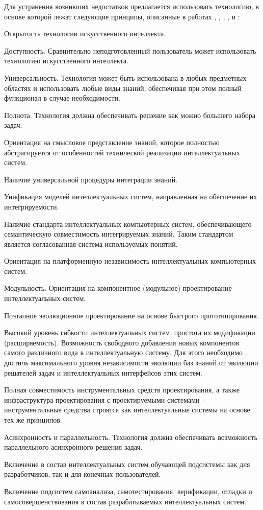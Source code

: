 \begin{partbacktext}
Для устранения возникших недостатков предлагается использовать технологию, в основе которой лежат следующие принципы, описанные в работах , , , ,  и :
\begin{textitemize}
	\item{Открытость технологии искусственного интеллекта.}
	\item{Доступность. Сравнительно неподготовленный пользователь может использовать технологию искусственного интеллекта.}
	\item{Универсальность. Технология может быть использована в любых предметных областях и использовать любые виды знаний, обеспечивая при этом полный функционал в случае необходимости.}
	\item{Полнота. Технология должна обеспечивать решение как можно большего набора задач.}
	\item{Ориентация на смысловое представление знаний, которое полностью абстрагируется от	особенностей технической реализации интеллектуальных систем.}
	\item{Наличие универсальной процедуры интеграции знаний.}
	\item{Унификация моделей интеллектуальных систем, направленная на обеспечение их интегрируемости.}
	\item{Наличие стандарта интеллектуальных компьютерных систем, обеспечивающего семантическую совместимость интегрируемых знаний. Таким стандартом является согласованная система используемых понятий.}
	\item{Ориентация на платформенную независимость интеллектуальных компьютерных систем.}
	\item{Модульность. Ориентация на компонентное (модульное) проектирование интеллектуальных систем.}
	\item{Поэтапное эволюционное проектирование на основе быстрого прототипирования.}
	\item{Высокий уровень гибкости интеллектуальных систем, простота их модификации (расширяемость). Возможность свободного добавления новых компонентов самого различного вида в интеллектуальную систему. Для этого необходимо достичь максимального уровня независимости эволюции баз знаний от эволюции решателей задач и интеллектуальных интерфейсов этих систем.}
	\item{Полная совместимость инструментальных средств проектирования, а также инфраструктура проектирования с проектируемыми системами -- инструментальные средства строятся как интеллектуальные системы на основе тех же принципов.}
	\item{Асинхронность и параллельность. Технология должна обеспечивать возможность параллельного асинхронного решения задач.}
	\item{Включение в состав интеллектуальных систем обучающей подсистемы как для разработчиков, так и для конечных пользователей.}
	\item{Включение подсистем самоанализа, самотестирования, верификации, отладки и самосовершенствования в состав разрабатываемых интеллектуальных систем.}
\end{textitemize}


\end{partbacktext}
